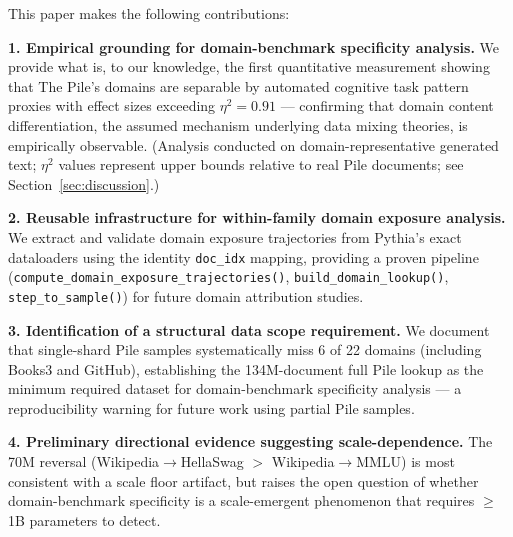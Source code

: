 This paper makes the following contributions:

\textbf{1. Empirical grounding for domain-benchmark specificity analysis.} We provide what is, to our knowledge, the first quantitative measurement showing that The Pile's domains are separable by automated cognitive task pattern proxies with effect sizes exceeding $\eta^2 = 0.91$ --- confirming that domain content differentiation, the assumed mechanism underlying data mixing theories, is empirically observable. (Analysis conducted on domain-representative generated text; $\eta^2$ values represent upper bounds relative to real Pile documents; see Section~\ref{sec:discussion}.)

\textbf{2. Reusable infrastructure for within-family domain exposure analysis.} We extract and validate domain exposure trajectories from Pythia's exact dataloaders using the identity \texttt{doc\_idx} mapping, providing a proven pipeline (\texttt{compute\_domain\_exposure\_trajectories()}, \texttt{build\_domain\_lookup()}, \texttt{step\_to\_sample()}) for future domain attribution studies.

\textbf{3. Identification of a structural data scope requirement.} We document that single-shard Pile samples systematically miss 6 of 22 domains (including Books3 and GitHub), establishing the 134M-document full Pile lookup as the minimum required dataset for domain-benchmark specificity analysis --- a reproducibility warning for future work using partial Pile samples.

\textbf{4. Preliminary directional evidence suggesting scale-dependence.} The 70M reversal (Wikipedia$\to$HellaSwag $>$ Wikipedia$\to$MMLU) is most consistent with a scale floor artifact, but raises the open question of whether domain-benchmark specificity is a scale-emergent phenomenon that requires $\geq$1B parameters to detect.
